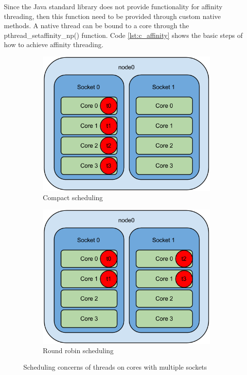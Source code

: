 \documentclass[final_report.tex]{subfiles}
\begin{document}
Since the Java standard library does not provide functionality for affinity threading, then this function need to be provided through custom native methods. A native thread can be bound to a core through the pthread\_setaffinity\_np() function. Code \ref{lst:c_affinity} shows the basic steps of how to achieve affinity threading.

\begin{figure}[H]
	\centering
	\begin{subfigure}{0.5\textwidth}
		\includegraphics[width=\textwidth]{img/aff1.png}
		\caption{Compact scheduling}
		\label{fig:aff1}
	\end{subfigure}%
	\begin{subfigure}{0.5\textwidth}
		\includegraphics[width=\textwidth]{img/aff2.png}
		\caption{Round robin scheduling}
		\label{fig:aff2}
	\end{subfigure}
	\caption{Scheduling concerns of threads on cores with multiple sockets}
	\label{fig:aff}
\end{figure}
\end{document}
